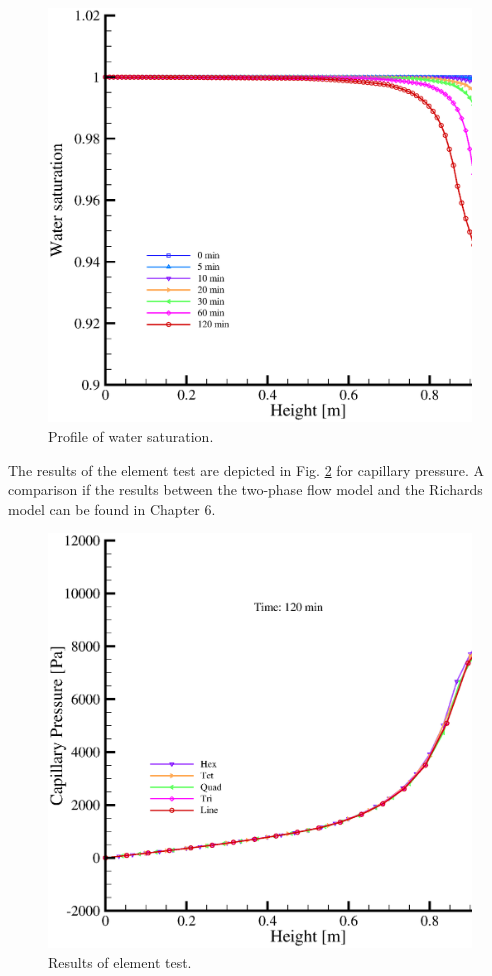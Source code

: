 \begin{figure}[!tbh]
\begin{center}
\includegraphics[scale=0.38]{chapter_13/figures/fig_13_1_3}
\end{center}
\caption{Profile of water saturation.}
\label{liak:p_sat}
\end{figure}

The results of the element test are depicted in Fig. \ref{liak:p_pce} for capillary pressure. A comparison if the results between the two-phase flow model and the Richards model can be found in Chapter 6. 

\begin{figure}[!tbh]
\begin{center}
\includegraphics[scale=0.38]{chapter_13/figures/fig_13_1_4}
\end{center}
\caption{Results of element test.}
\label{liak:p_pce}
\end{figure}

